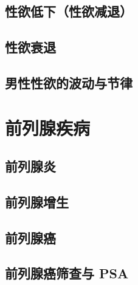 \section{性欲低下（性欲减退）}

\section{性欲衰退}

\section{男性性欲的波动与节律}

\chapter{前列腺疾病}

\section{前列腺炎}

\section{前列腺增生}

\section{前列腺癌}

\section{前列腺癌筛查与 PSA}

